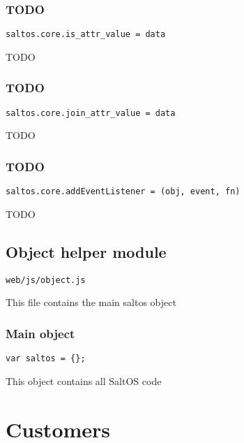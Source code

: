 \documentclass[a4paper]{book}
\begin{document}
\hypertarget{toc498}{}
\subsection{TODO}

\begin{lstlisting}
saltos.core.is_attr_value = data
\end{lstlisting}

TODO

\hypertarget{toc499}{}
\subsection{TODO}

\begin{lstlisting}
saltos.core.join_attr_value = data
\end{lstlisting}

TODO

\hypertarget{toc500}{}
\subsection{TODO}

\begin{lstlisting}
saltos.core.addEventListener = (obj, event, fn)
\end{lstlisting}

TODO

\hypertarget{toc501}{}
\section{Object helper module}

\begin{lstlisting}
web/js/object.js
\end{lstlisting}

This file contains the main saltos object

\hypertarget{toc502}{}
\subsection{Main object}

\begin{lstlisting}
var saltos = {};
\end{lstlisting}

This object contains all SaltOS code


\hypertarget{toc503}{}
\chapter{Customers}
\end{document}
